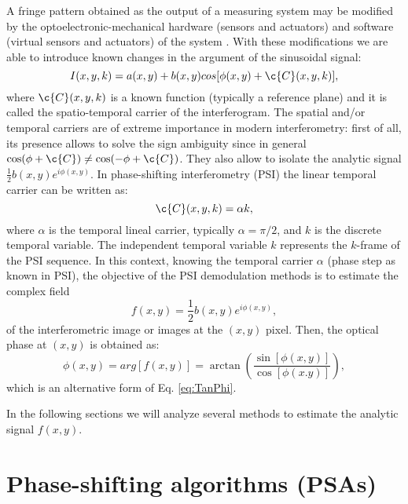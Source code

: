 A fringe pattern obtained as the output of a measuring system may be modified
by the optoelectronic-mechanical hardware (sensors and actuators) and software
(virtual sensors and actuators) of the system \cite{Kujawinska2006}. With these 
modifications we are able to introduce known changes in the argument of the 
sinusoidal signal:
\begin{equation}\label{eq:FringePatternTemporal}
 I(x,y,k)=a(x,y)+b(x,y)cos[\phi(x,y) + \c{C}(x,y,k)],
\end{equation}
where $\c{C}(x,y,k)$ is a known function (typically a reference plane) and it is 
called the spatio-temporal carrier of the interferogram. The spatial and/or 
temporal carriers are of extreme importance in modern interferometry: first of 
all, its presence allows to solve the sign ambiguity since in general 
$\cos(\phi+\c{C})\not=\cos(-\phi+\c{C})$. They also allow to isolate the analytic 
signal
$\frac{1}{2} b(x,y)e^{i \phi(x,y)}$. In phase-shifting interferometry (PSI) the
linear temporal carrier can be written as:
\begin{equation}\label{PSIcarrier}
 \c{C}(x,y,k)=\alpha k,
\end{equation}
where $\alpha$ is the temporal lineal carrier, typically $\alpha=\pi/2$, and $k$
is the discrete temporal variable. The independent temporal variable $k$ represents
the $k$-frame of the PSI sequence. In this context, knowing the temporal carrier 
$\alpha$ (phase step as known in PSI), the objective of the PSI demodulation 
methods is to estimate the complex field
\begin{equation}\label{eq:Complexfield}
 f(x,y)=\frac{1}{2}b(x,y)e^{i\phi(x,y)},
\end{equation}
of the interferometric image or images at the $(x,y)$ pixel. Then, the optical 
phase at $(x,y)$ is obtained as:
\begin{equation}\label{eq:PSIphase}
  \phi(x,y)=arg[f(x,y)]=\arctan\left(\frac{\sin[\phi(x,y)]}{\cos[\phi(x.y)]}
\right),
\end{equation}
which is an alternative form of Eq. \eqref{eq:TanPhi}.

In the following sections we will analyze several methods to estimate the 
analytic signal $f(x,y)$.

\section{Phase-shifting algorithms (PSAs)}

